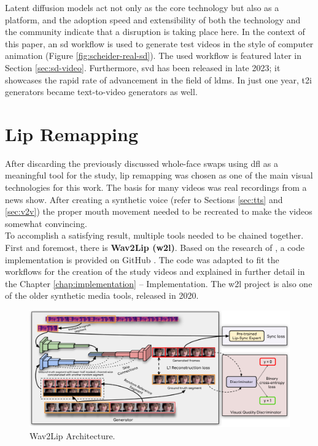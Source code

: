 \documentclass[
  a4paper,  %
  twoside,  %
  bibliography=totoc,
  headsepline,
  cleardoublepage=empty,
  parskip=half,
  draft=false
]{scrbook}
\begin{document}
Latent diffusion models act not only as the core technology but also as a platform, and the adoption speed and extensibility of both the technology and the community indicate that a disruption is taking place here. In the context of this paper, an \gls{sd} workflow is used to generate test videos in the style of computer animation (Figure \ref{fig:scheider-real-sd}). The used workflow is featured later in Section \ref{sec:sd-video}. Furthermore, \gls{svd} has been released in late 2023; it showcases the rapid rate of advancement in the field of \gls{ldm}s. In just one year, \gls{t2i} generators became text-to-video generators as well.


\section{Lip Remapping}
\label{sec:lips}
After discarding the previously discussed whole-face swaps using \gls{dfl} as a meaningful tool for the study, lip remapping was chosen as one of the main visual technologies for this work. The basis for many videos was real recordings from a news show. After creating a synthetic voice (refer to Sections \ref{sec:tts} and \ref{sec:v2v}) the proper mouth movement needed to be recreated to make the videos somewhat convincing. \\
To accomplish a satisfying result, multiple tools needed to be chained together. First and foremost, there is \textbf{Wav2Lip (\gls{w2l})}. Based on the research of \citet{prajwalLipSyncExpert2020}, a code implementation is provided on GitHub \cite{mukhopadhyayWav2LipAccuratelyLipsyncing2023}. The code was adapted to fit the workflows for the creation of the study videos and explained in further detail in the Chapter \ref{chap:implementation} – Implementation. The \gls{w2l} project is also one of the older synthetic media tools, released in 2020.

\begin{figure}[h]
  \centering
  \includegraphics[width=1\textwidth]{./graphics/w2l-arch.png}
  \caption{Wav2Lip Architecture.}
  \label{fig:wav2lip-arch}
\end{figure}
\end{document}
